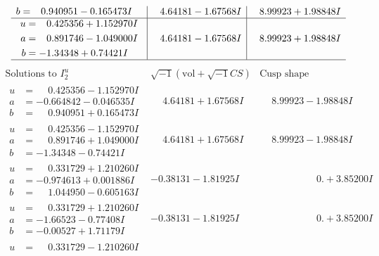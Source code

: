 \documentclass[1p]{elsarticle_modified}
\theoremstyle{definition}
\newcommand{\I}{\sqrt{-1}}
\begin{document}
$$\begin{array}{c|c|c}
\begin{aligned}
b &= \phantom{-}0.940951 - 0.165473 I\end{aligned}
 & \phantom{-}4.64181 - 1.67568 I & \phantom{-}8.99923 + 1.98848 I \\ \hline\begin{aligned}
u &= \phantom{-}0.425356 + 1.152970 I \\
a &= \phantom{-}0.891746 - 1.049000 I \\
b &= -1.34348 + 0.74421 I\end{aligned}
 & \phantom{-}4.64181 - 1.67568 I & \phantom{-}8.99923 + 1.98848 I\\
 \hline 
 \end{array}$$\newpage$$\begin{array}{c|c|c}  
\text{Solutions to }I^u_{2}& \I (\text{vol} + \sqrt{-1}CS) & \text{Cusp shape}\\
 \hline 
\begin{aligned}
u &= \phantom{-}0.425356 - 1.152970 I \\
a &= -0.664842 - 0.046535 I \\
b &= \phantom{-}0.940951 + 0.165473 I\end{aligned}
 & \phantom{-}4.64181 + 1.67568 I & \phantom{-}8.99923 - 1.98848 I \\ \hline\begin{aligned}
u &= \phantom{-}0.425356 - 1.152970 I \\
a &= \phantom{-}0.891746 + 1.049000 I \\
b &= -1.34348 - 0.74421 I\end{aligned}
 & \phantom{-}4.64181 + 1.67568 I & \phantom{-}8.99923 - 1.98848 I \\ \hline\begin{aligned}
u &= \phantom{-}0.331729 + 1.210260 I \\
a &= -0.974613 + 0.001886 I \\
b &= \phantom{-}1.044950 - 0.605163 I\end{aligned}
 & -0.38131 - 1.81925 I & \phantom{-0.000000 -}0. + 3.85200 I \\ \hline\begin{aligned}
u &= \phantom{-}0.331729 + 1.210260 I \\
a &= -1.66523 - 0.77408 I \\
b &= -0.00527 + 1.71179 I\end{aligned}
 & -0.38131 - 1.81925 I & \phantom{-0.000000 -}0. + 3.85200 I \\ \hline\begin{aligned}
u &= \phantom{-}0.331729 - 1.210260 I \\

\end{aligned}
\end{array}$$
\end{document}
